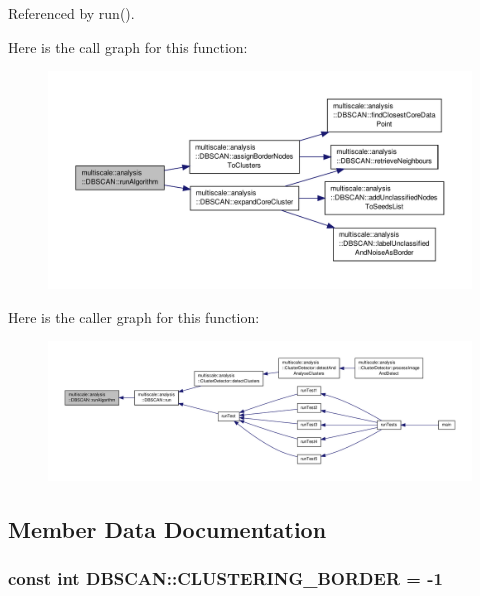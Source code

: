 Referenced by run().



Here is the call graph for this function\-:\nopagebreak
\begin{figure}[H]
\begin{center}
\leavevmode
\includegraphics[width=350pt]{classmultiscale_1_1analysis_1_1DBSCAN_aceb5dd9fe24a24cbf09ddc9082dc1f82_cgraph}
\end{center}
\end{figure}




Here is the caller graph for this function\-:\nopagebreak
\begin{figure}[H]
\begin{center}
\leavevmode
\includegraphics[width=350pt]{classmultiscale_1_1analysis_1_1DBSCAN_aceb5dd9fe24a24cbf09ddc9082dc1f82_icgraph}
\end{center}
\end{figure}




\subsection{Member Data Documentation}
\hypertarget{classmultiscale_1_1analysis_1_1DBSCAN_a28f37ffc029ccd1d121cbc4467851ce2}{
\subsubsection[{C\-L\-U\-S\-T\-E\-R\-I\-N\-G\-\_\-\-B\-O\-R\-D\-E\-R}]{\setlength{\rightskip}{0pt plus 5cm}const int D\-B\-S\-C\-A\-N\-::\-C\-L\-U\-S\-T\-E\-R\-I\-N\-G\-\_\-\-B\-O\-R\-D\-E\-R = -\/1\hspace{0.3cm}{\ttfamily [static]}}}\label{classmultiscale_1_1analysis_1_1DBSCAN_a28f37ffc029ccd1d121cbc4467851ce2}


